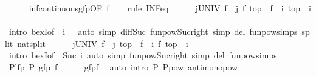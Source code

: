 \begin{isabellebody}
\ \ \ \ \isamarkupfalse%
\ inf{\isacharunderscore}continuous{\isacharunderscore}gfp{\isacharbrackleft}OF\ f{\isacharbrackright}\isanewline
\ \ \isamarkupfalse%
\ {\isacharparenleft}rule\ INF{\isacharunderscore}eq{\isacharparenright}\isanewline
\ \ \ \ \isamarkupfalse%
\ {\isachardoublequoteopen}{\isasymexists}j{\isasymin}UNIV{\isachardot}\ {\isacharparenleft}f\ {\isacharcircum}{\isacharcircum}\ j{\isacharparenright}\ {\isacharparenleft}f\ top{\isacharparenright}\ {\isasymle}\ {\isacharparenleft}f\ {\isacharcircum}{\isacharcircum}\ i{\isacharparenright}\ top{\isachardoublequoteclose}\ \ i\isanewline
\ \ \ \ \ \ \isamarkupfalse%
\ {\isacharparenleft}intro\ bexI{\isacharbrackleft}of\ {\isacharunderscore}\ {\isachardoublequoteopen}i\ {\isacharminus}\ {}{\isachardoublequoteclose}{\isacharbrackright}{\isacharparenright}\ {\isacharparenleft}auto\ simp{\isacharcolon}\ diff{\isacharunderscore}Suc\ funpow{\isacharunderscore}Suc{\isacharunderscore}right\ simp\ del{\isacharcolon}\ funpow{\isachardot}simps{\isacharparenleft}{}{\isacharparenright}\ split{\isacharcolon}\ nat{\isachardot}split{\isacharparenright}\isanewline
\ \ \ \ \isamarkupfalse%
\ {\isachardoublequoteopen}{\isasymexists}j{\isasymin}UNIV{\isachardot}\ {\isacharparenleft}f\ {\isacharcircum}{\isacharcircum}\ j{\isacharparenright}\ top\ {\isasymle}\ {\isacharparenleft}f\ {\isacharcircum}{\isacharcircum}\ i{\isacharparenright}\ {\isacharparenleft}f\ top{\isacharparenright}{\isachardoublequoteclose}\ \ i\isanewline
\ \ \ \ \ \ \isamarkupfalse%
\ {\isacharparenleft}intro\ bexI{\isacharbrackleft}of\ {\isacharunderscore}\ {\isachardoublequoteopen}Suc\ i{\isachardoublequoteclose}{\isacharbrackright}{\isacharparenright}\ {\isacharparenleft}auto\ simp{\isacharcolon}\ funpow{\isacharunderscore}Suc{\isacharunderscore}right\ simp\ del{\isacharcolon}\ funpow{\isachardot}simps{\isacharparenleft}{}{\isacharparenright}{\isacharparenright}\isanewline
\ \ \isamarkupfalse%
\isanewline
\isanewline
\ \ \isamarkupfalse%
\ P{\isacharunderscore}lfp{\isacharcolon}\ {\isachardoublequoteopen}P\ {\isacharparenleft}gfp\ f{\isacharparenright}{\isachardoublequoteclose}\isanewline
\ \ \ \ \isamarkupfalse%
\ gfp{\isacharunderscore}f\ \isamarkupfalse%
\ {\isacharparenleft}auto\ intro{\isacharbang}{\isacharcolon}\ P\ P{\isacharunderscore}pow\ antimono{\isacharunderscore}pow{}{\isacharparenright}\isanewline

\end{isabellebody}
